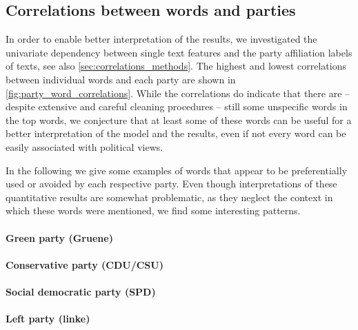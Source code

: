 \documentclass[runningheads,a4paper]{llncs}
\begin{document}
\subsection{Correlations between words and parties}\label{sec:word_party_correlations}

In order to enable better interpretation of the results, we investigated the univariate dependency between single text features and the party affiliation labels of texts, see also \autoref{sec:correlations_methods}. The highest and lowest correlations between individual words and each party are shown in \autoref{fig:party_word_correlations}. While the correlations do indicate that there are -- despite extensive and careful cleaning procedures -- still some unspecific words in the top words, we conjecture that at least some of these words can be useful for a better interpretation of the model and the results, even if not every word can be easily associated with political views. 

In the following we give some examples of words that appear to be preferentially used or avoided by each respective party. Even though interpretations of these quantitative results are somewhat problematic, as they neglect the context in which these words were mentioned, we find some interesting patterns. 

\paragraph{\bf Green party (Gruene)}

\paragraph{\bf Conservative party (CDU/CSU)}

\paragraph{\bf Social democratic party (SPD)}

\paragraph{\bf Left party (linke)}
\end{document}
